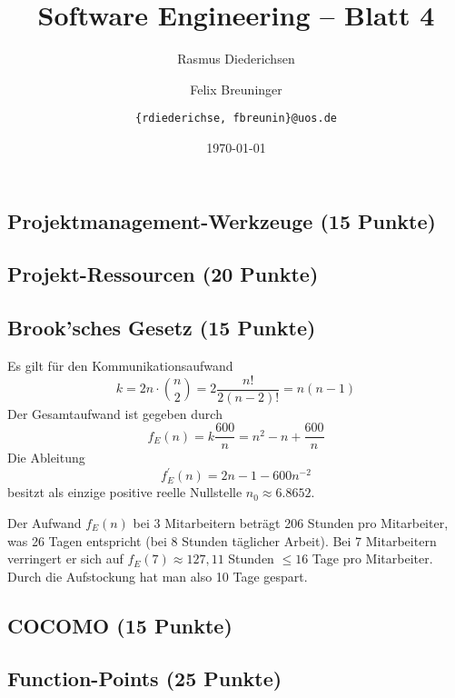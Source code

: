 \documentclass{scrartcl}
\title{\rmfamily Software Engineering -- Blatt 4}
\author{Rasmus Diederichsen \and Felix Breuninger\and %
   \texttt{\{rdiederichse, fbreunin\}@uos.de}
}
\date{\today}
\begin{document}
\selectfont
\maketitle

\setcounter{section}{4}
\setcounter{subsection}{0}

\subsection{Projektmanagement-Werkzeuge (15 Punkte)}

\subsection{Projekt-Ressourcen (20 Punkte)}

\subsection{Brook'sches Gesetz (15 Punkte)}

Es gilt für den Kommunikationsaufwand
\begin{equation*}
   k = 2n \cdot {n \choose 2} = 2 \frac{n!}{2(n-2)!} = n(n-1)
\end{equation*}
 Der Gesamtaufwand ist gegeben durch
 \begin{equation*}
    f_E(n) = k \frac{600}{n} = n^2 - n + \frac{600}{n}
 \end{equation*}
 Die Ableitung
 \begin{equation*}
    f_E^\prime(n) = 2n -1 - 600n^{-2}
 \end{equation*}
 besitzt als einzige positive reelle Nullstelle $n_0 \approx 6.8652$.

Der Aufwand $f_E(n)$ bei 3 Mitarbeitern beträgt 206 Stunden pro Mitarbeiter, was
26 Tagen entspricht (bei 8 Stunden täglicher Arbeit).
Bei 7 Mitarbeitern verringert er sich auf $f_E(7)\approx 127,11$ Stunden $\le
16$ Tage pro Mitarbeiter. Durch die Aufstockung hat man also 10 Tage gespart.

\subsection{COCOMO (15 Punkte)}

\subsection{Function-Points (25 Punkte)}
\end{document}

